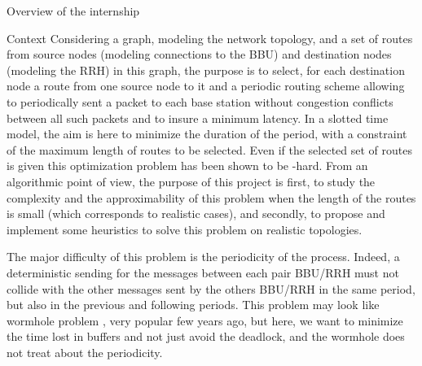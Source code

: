 \documentclass[a4paper,10pt]{report}
\begin{document}
\begin{chapter}{Overview of the internship}
\begin{section}{Context}
Considering a graph, modeling the network topology, and a set of routes from source nodes (modeling connections to the BBU) and destination 
nodes (modeling the RRH) in this graph, the purpose is to select, for each destination node a route from one source node to it and a periodic 
routing scheme allowing to periodically sent a packet to each base station without congestion conflicts between all such packets and to insure a minimum latency. In a slotted time model, the aim is here to minimize the duration of the period, with a constraint of the maximum length of routes to be
selected. Even if the selected set of routes is given this optimization problem has been shown to be  \NP-hard. From an algorithmic point of view,
the purpose of this project is first, to study the complexity and the approximability of this problem when the length of the routes is small
(which corresponds to realistic cases), and secondly, to propose and implement some heuristics to solve this problem on realistic topologies.


The major difficulty of this problem is the periodicity of the process. Indeed, a deterministic sending for the messages
between each pair BBU/RRH must not collide with the other messages sent by the others BBU/RRH in the same period, but also in the previous
and following periods. This problem may look like wormhole problem \cite{cole1996benefit}, very popular few years ago, but here, we want to minimize the time lost in buffers and not just avoid the deadlock, and the wormhole does not treat about the periodicity.
\end{section}

\end{chapter}
\end{document}
